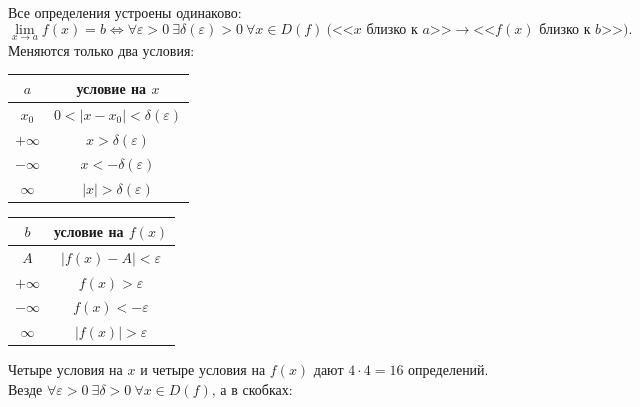 \documentclass[a4paper,11pt]{article}
\newcommand{\eps}{\varepsilon}
\begin{document}
Все определения устроены одинаково:
\[
  \lim_{x \to a} f(x) = b \Leftrightarrow \forall \eps > 0\ \exists \delta(\eps) > 0\
  \forall x \in D(f)\ \bigl( \text{<<$x$ близко к $a$>>} \to \text{<<$f(x)$ близко к $b$>>} \bigr).
\]
Меняются только два условия:
\begin{center}
\renewcommand{\arraystretch}{1.3}
\begin{tabular}{|c|c|}
  \hline
  $a$ & условие на $x$ \\ \hline
  $x_0$ & $0 < |x - x_0| < \delta(\eps)$ \\
  $+\infty$ & $x > \delta(\eps)$ \\
  $-\infty$ & $x < -\delta(\eps)$ \\
  $\infty$ & $|x| > \delta(\eps)$ \\ \hline
\end{tabular}
\qquad
\begin{tabular}{|c|c|}
  \hline
  $b$ & условие на $f(x)$ \\ \hline
  $A$ & $|f(x) - A| < \eps$ \\
  $+\infty$ & $f(x) > \eps$ \\
  $-\infty$ & $f(x) < -\eps$ \\
  $\infty$ & $|f(x)| > \eps$ \\ \hline
\end{tabular}
\end{center}
Четыре условия на $x$ и четыре условия на $f(x)$ дают $4 \cdot 4 = 16$ определений. Везде
$\forall \eps > 0\ \exists \delta > 0\ \forall x \in D(f)$, а в скобках:
\end{document}
